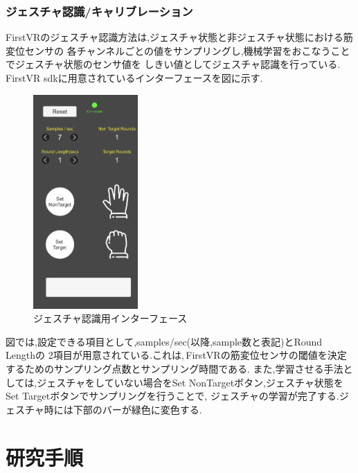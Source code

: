 \documentclass{ltjsreport}
\begin{document}
		\subsection{ジェスチャ認識/キャリブレーション}
			FirstVRのジェスチャ認識方法は,ジェスチャ状態と非ジェスチャ状態における筋変位センサの
			各チャンネルごとの値をサンプリングし,機械学習をおこなうことでジェスチャ状態のセンサ値を
			しきい値としてジェスチャ認識を行っている.\,FirstVR sdkに用意されているインターフェースを図に示す.
			\begin{figure}[H]
			\centering
			\includegraphics[width = 4cm]{../figs/FVRsdk.png}
			\caption{ジェスチャ認識用インターフェース}
			\label{fig:gestureinterface}
			\end{figure}
			\vspace{-15pt}
			図では,設定できる項目として,samples/sec(以降,sample数と表記)とRound Lengthの
			2項目が用意されている.これは,\,FirstVRの筋変位センサの閾値を決定するためのサンプリング点数とサンプリング時間である.
			また,学習させる手法としては,ジェスチャをしていない場合をSet NonTargetボタン,ジェスチャ状態をSet Targetボタンでサンプリングを行うことで,
			ジェスチャの学習が完了する.ジェスチャ時には下部のバーが緑色に変色する.


\chapter{研究手順}
\end{document}
